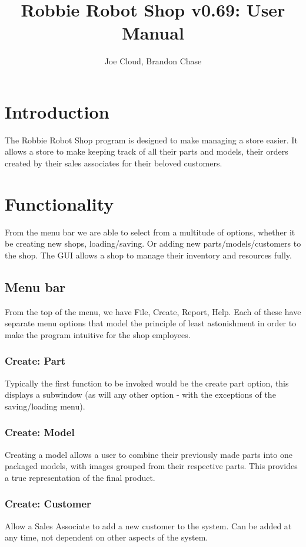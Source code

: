 \documentclass{article}
\title{Robbie Robot Shop v0.69: User Manual}
\author{Joe Cloud, Brandon Chase}
\begin{document}
\maketitle 

\section{Introduction}

The Robbie Robot Shop program is designed to make managing a store easier. It allows a store to make keeping track of all their parts and models, their orders created by their sales associates for their beloved customers. 

\section{Functionality}
From the menu bar we are able to select from a multitude of options, whether it be creating new shops, loading/saving. Or adding new parts/models/customers to the shop. The GUI allows a shop to manage their inventory and resources fully.
\subsection{Menu bar}
From the top of the menu, we have File, Create, Report, Help.
Each of these have separate menu options that model the principle of least astonishment in order to make the program intuitive for the shop employees.

\subsubsection{Create: Part}
Typically the first function to be invoked would be the create part option, this displays a subwindow (as will any other option - with the exceptions of the saving/loading menu).
\subsubsection{Create: Model}
Creating a model allows a user to combine their previously made parts into one packaged models, with images grouped from their respective parts. This provides a true representation of the final product.
\subsubsection{Create: Customer}
Allow a Sales Associate to add a new customer to the system.
Can be added at any time, not dependent on other aspects of the system.
\end{document}
